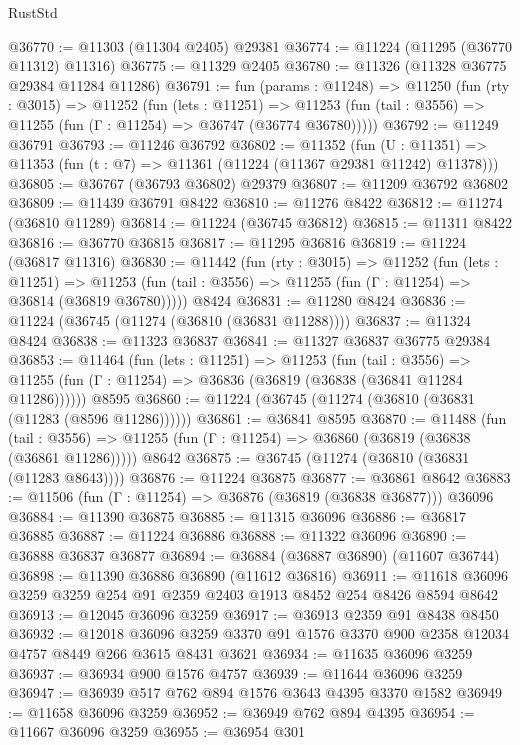\begin{lexlean}{RustStd}
\begin{coremodule}
@36770 := @11303 (@11304 @2405) @29381
@36774 := @11224 (@11295 (@36770 @11312) @11316)
@36775 := @11329 @2405
@36780 := @11326 (@11328 @36775 @29384 @11284 @11286)
@36791 := fun (params : @11248) =>
  @11250
    (fun (rty : @3015) =>
    @11252
      (fun (lets : @11251) =>
      @11253 (fun (tail : @3556) => @11255 (fun (Γ : @11254) => @36747 (@36774 @36780)))))
@36792 := @11249 @36791
@36793 := @11246 @36792
@36802 := @11352
    (fun (U : @11351) => @11353 (fun (t : @7) => @11361 (@11224 (@11367 @29381 @11242) @11378)))
@36805 := @36767 (@36793 @36802) @29379
@36807 := @11209 @36792 @36802
@36809 := @11439 @36791 @8422
@36810 := @11276 @8422
@36812 := @11274 (@36810 @11289)
@36814 := @11224 (@36745 @36812)
@36815 := @11311 @8422
@36816 := @36770 @36815
@36817 := @11295 @36816
@36819 := @11224 (@36817 @11316)
@36830 := @11442
    (fun (rty : @3015) =>
    @11252
      (fun (lets : @11251) =>
      @11253 (fun (tail : @3556) => @11255 (fun (Γ : @11254) => @36814 (@36819 @36780)))))
    @8424
@36831 := @11280 @8424
@36836 := @11224 (@36745 (@11274 (@36810 (@36831 @11288))))
@36837 := @11324 @8424
@36838 := @11323 @36837
@36841 := @11327 @36837 @36775 @29384
@36853 := @11464
    (fun (lets : @11251) =>
    @11253
      (fun (tail : @3556) =>
      @11255 (fun (Γ : @11254) => @36836 (@36819 (@36838 (@36841 @11284 @11286))))))
    @8595
@36860 := @11224 (@36745 (@11274 (@36810 (@36831 (@11283 (@8596 @11286))))))
@36861 := @36841 @8595
@36870 := @11488
    (fun (tail : @3556) => @11255 (fun (Γ : @11254) => @36860 (@36819 (@36838 (@36861 @11286)))))
    @8642
@36875 := @36745 (@11274 (@36810 (@36831 (@11283 @8643))))
@36876 := @11224 @36875
@36877 := @36861 @8642
@36883 := @11506 (fun (Γ : @11254) => @36876 (@36819 (@36838 @36877))) @36096
@36884 := @11390 @36875
@36885 := @11315 @36096
@36886 := @36817 @36885
@36887 := @11224 @36886
@36888 := @11322 @36096
@36890 := @36888 @36837 @36877
@36894 := @36884 (@36887 @36890) (@11607 @36744)
@36898 := @11390 @36886 @36890 (@11612 @36816)
@36911 := @11618 @36096 @3259 @3259 @254 @91 @2359 @2403 @1913 @8452 @254 @8426 @8594 @8642
@36913 := @12045 @36096 @3259
@36917 := @36913 @2359 @91 @8438 @8450
@36932 := @12018
    @36096
    @3259
    @3370
    @91
    @1576
    @3370
    @900
    @2358
    @12034
    @4757
    @8449
    @266
    @3615
    @8431
    @3621
@36934 := @11635 @36096 @3259
@36937 := @36934 @900 @1576 @4757
@36939 := @11644 @36096 @3259
@36947 := @36939 @517 @762 @894 @1576 @3643 @4395 @3370 @1582
@36949 := @11658 @36096 @3259
@36952 := @36949 @762 @894 @4395
@36954 := @11667 @36096 @3259
@36955 := @36954 @301

\end{coremodule}
\end{lexlean}
